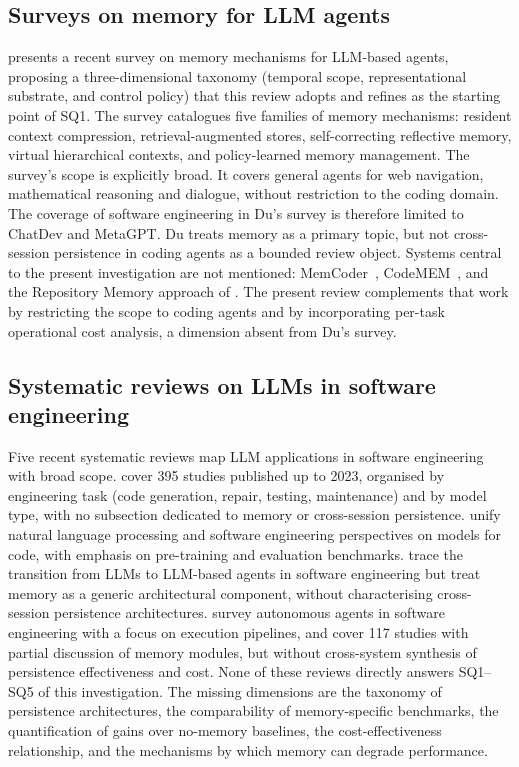 \subsection{Surveys on memory for LLM agents}
\label{sec:rel-memoria}

\citet{du2026memory} presents a recent survey on memory
mechanisms for LLM-based agents, proposing a three-dimensional taxonomy
(temporal scope, representational substrate, and control policy) that
this review adopts and refines as the starting point of SQ1.
The survey catalogues five families of memory mechanisms: resident
context compression, retrieval-augmented stores, self-correcting
reflective memory, virtual hierarchical contexts, and policy-learned
memory management.
The survey's scope is explicitly broad.
It covers general agents for web navigation, mathematical reasoning and
dialogue, without restriction to the coding domain.
The coverage of software engineering in Du's survey is therefore
limited to ChatDev and MetaGPT.
Du treats memory as a primary topic, but not cross-session persistence
in coding agents as a bounded review object.
Systems central to the present investigation are not mentioned:
MemCoder~\citep{deng2026memcoder},
CodeMEM~\citep{wang2026codemem}, and the Repository Memory approach of
\citet{wang2026improving}.
The present review complements that work by restricting the scope to
coding agents and by incorporating per-task operational cost analysis,
a dimension absent from Du's survey.

\subsection{Systematic reviews on LLMs in software engineering}
\label{sec:rel-llmse}

Five recent systematic reviews map LLM applications in software
engineering with broad scope.
\citet{hou2024llmse} cover 395 studies published up to 2023, organised
by engineering task (code generation, repair, testing, maintenance) and
by model type, with no subsection dedicated to memory or cross-session
persistence.
\citet{zhang2024unifying} unify natural language processing and
software engineering perspectives on models for code, with emphasis on
pre-training and evaluation benchmarks.
\citet{jin2024llmagents} trace the transition from LLMs to LLM-based
agents in software engineering but treat memory as a generic
architectural component, without characterising cross-session
persistence architectures.
\citet{wang2024llmagents} survey autonomous agents in software
engineering with a focus on execution pipelines, and
\citet{liu2024llmagents} cover 117 studies with partial discussion of
memory modules, but without cross-system synthesis of persistence
effectiveness and cost.
None of these reviews directly answers SQ1--SQ5 of this investigation.
The missing dimensions are the taxonomy of persistence architectures,
the comparability of memory-specific benchmarks, the quantification of
gains over no-memory baselines, the cost-effectiveness relationship,
and the mechanisms by which memory can degrade performance.

